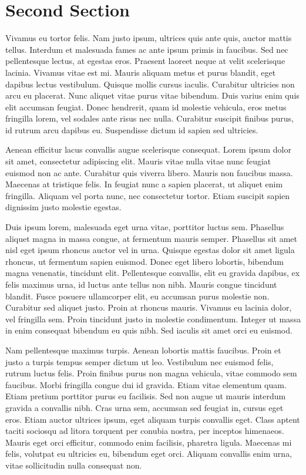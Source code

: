 \documentclass{frccs2024}
\begin{document}
\section{Second Section}

Vivamus eu tortor felis. Nam justo ipsum, ultrices quis ante quis, auctor mattis tellus. Interdum et malesuada fames ac ante ipsum primis in faucibus. Sed nec pellentesque lectus, at egestas eros. Praesent laoreet neque at velit scelerisque lacinia. Vivamus vitae est mi. Mauris aliquam metus et purus blandit, eget dapibus lectus vestibulum. Quisque mollis cursus iaculis. Curabitur ultricies non arcu eu placerat. Nunc aliquet vitae purus vitae bibendum. Duis varius enim quis elit accumsan feugiat. Donec hendrerit, quam id molestie vehicula, eros metus fringilla lorem, vel sodales ante risus nec nulla. Curabitur suscipit finibus purus, id rutrum arcu dapibus eu. Suspendisse dictum id sapien sed ultricies.

Aenean efficitur lacus convallis augue scelerisque consequat. Lorem ipsum dolor sit amet, consectetur adipiscing elit. Mauris vitae nulla vitae nunc feugiat euismod non ac ante. Curabitur quis viverra libero. Mauris non faucibus massa. Maecenas at tristique felis. In feugiat nunc a sapien placerat, ut aliquet enim fringilla. Aliquam vel porta nunc, nec consectetur tortor. Etiam suscipit sapien dignissim justo molestie egestas.

Duis ipsum lorem, malesuada eget urna vitae, porttitor luctus sem. Phasellus aliquet magna in massa congue, at fermentum mauris semper. Phasellus sit amet nisl eget ipsum rhoncus auctor vel in urna. Quisque egestas dolor sit amet ligula rhoncus, ut fermentum sapien euismod. Donec eget libero lobortis, bibendum magna venenatis, tincidunt elit. Pellentesque convallis, elit eu gravida dapibus, ex felis maximus urna, id luctus ante tellus non nibh. Mauris congue tincidunt blandit. Fusce posuere ullamcorper elit, eu accumsan purus molestie non. Curabitur sed aliquet justo. Proin at rhoncus mauris. Vivamus eu lacinia dolor, vel fringilla sem. Proin tincidunt justo in molestie condimentum. Integer ut massa in enim consequat bibendum eu quis nibh. Sed iaculis sit amet orci eu euismod.


Nam pellentesque maximus turpis. Aenean lobortis mattis faucibus. Proin et justo a turpis tempus semper dictum ut leo. Vestibulum nec euismod felis, rutrum luctus felis. Proin finibus purus non magna vehicula, vitae commodo sem faucibus. Morbi fringilla congue dui id gravida. Etiam vitae elementum quam. Etiam pretium porttitor purus eu facilisis. Sed non augue ut mauris interdum gravida a convallis nibh. Cras urna sem, accumsan sed feugiat in, cursus eget eros. Etiam auctor ultrices ipsum, eget aliquam turpis convallis eget. Class aptent taciti sociosqu ad litora torquent per conubia nostra, per inceptos himenaeos. Mauris eget orci efficitur, commodo enim facilisis, pharetra ligula. Maecenas mi felis, volutpat eu ultricies eu, bibendum eget orci. Aliquam convallis enim urna, vitae sollicitudin nulla consequat non.
\end{document}
